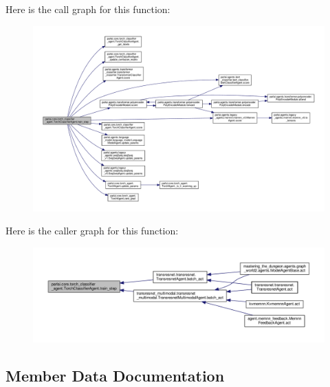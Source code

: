 Here is the call graph for this function\+:
\nopagebreak
\begin{figure}[H]
\begin{center}
\leavevmode
\includegraphics[width=350pt]{classparlai_1_1core_1_1torch__classifier__agent_1_1TorchClassifierAgent_a3baacdb005c5f5a6367c45c93d21d398_cgraph}
\end{center}
\end{figure}
Here is the caller graph for this function\+:
\nopagebreak
\begin{figure}[H]
\begin{center}
\leavevmode
\includegraphics[width=350pt]{classparlai_1_1core_1_1torch__classifier__agent_1_1TorchClassifierAgent_a3baacdb005c5f5a6367c45c93d21d398_icgraph}
\end{center}
\end{figure}


\subsection{Member Data Documentation}
\mbox{\label{classparlai_1_1core_1_1torch__classifier__agent_1_1TorchClassifierAgent_a80b1b3e0162c2dca36a1e1763cf3cad9}} 
